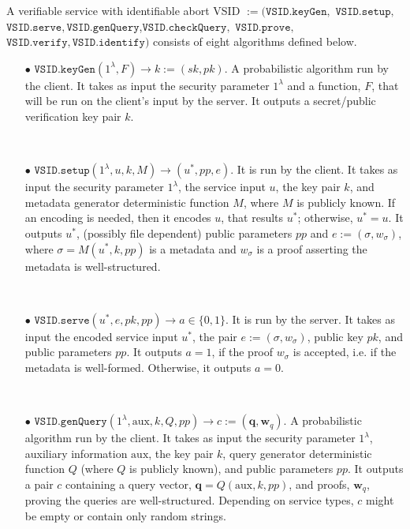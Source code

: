 \begin{definition}\label{service-def} A verifiable service with identifiable abort  VSID $:=(\mathtt{VSID.keyGen}, $ $\mathtt{VSID.setup}, $ $\mathtt{VSID.serve},\mathtt{VSID.genQuery}$,$\mathtt{VSID.checkQuery},$ $\mathtt{VSID.prove},$ $\mathtt{VSID.verify}, \mathtt{VSID.identify})$ consists of eight algorithms defined below.


\begin{itemize}
\item[$\bullet$] $\mathtt{VSID.keyGen}(1^{\lambda},F)\rightarrow k:=(sk,pk)$.  A probabilistic algorithm run by the client. It takes as input the security parameter $1^{\lambda}$ and a function, $F$, that will be run on the client's input by the server. It outputs a secret/public verification key pair $k$. %




\

\item[$\bullet$] $\mathtt{VSID.setup}(1^{\lambda}, u,k,M)\rightarrow (u^{\scriptscriptstyle *}, {pp},e)$. It is run by the client. It takes as input the security parameter $1^{\lambda}$,  the service  input $u$,  the key pair $k$, and metadata generator deterministic function $M$, where $M$ is publicly known. If an encoding is needed, then it encodes $u$, that results $u^{\scriptscriptstyle *}$; otherwise, $u^{\scriptscriptstyle *}=u$. It outputs  $u^{\scriptscriptstyle *}$, {(possibly file dependent) public parameters $pp$} and $e:=(\sigma,w_{\sigma})$, where $\sigma=M(u^{\scriptscriptstyle *},k, {pp})$ is a metadata and $w_{\sigma}$ is a proof asserting the metadata is well-structured.  

\

\item[$\bullet$] $\mathtt{VSID.serve}(u^{\scriptscriptstyle *},e,pk, {pp})\rightarrow a\in\{0,1\}$. It is run by the server. It takes as input the encoded service input $u^{\scriptscriptstyle *}$, the pair $e:=(\sigma,w_{\sigma})$, public key $pk$, and {public parameters $pp$}. It outputs $a=1$, if the proof $w_{\sigma}$ is accepted, i.e. if the metadata is well-formed. Otherwise, it outputs $a=0$. 

\

\item[$\bullet$] $\mathtt{VSID.genQuery}(1^{\lambda},  \text{aux}, k,Q,{pp})\rightarrow c:=(\bm{q},\bm{w}_{\scriptscriptstyle q})$. A probabilistic algorithm run by the client. It takes as input the security parameter $1^{\lambda}$, auxiliary information $ \text{aux}$,  the key pair $k$,    query generator deterministic function $Q$ (where $Q$ is publicly known), and { public parameters $pp$}. It outputs a pair $c$ containing a query vector, $\bm{q}=Q( \text{aux},k,{pp})$,  and proofs, $\bm{w}_{\scriptscriptstyle q}$, proving the queries are well-structured. Depending on service types, $c$ might be  empty or  contain only random strings.






\end{itemize}
\end{definition}
